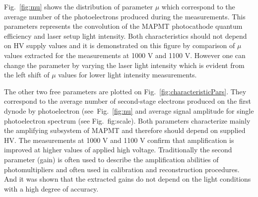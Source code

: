 Fig.~\ref{fig:mu} shows the distribution of parameter $\mu$ which correspond to the average number of the photoelectrons produced during the measurements.
This parameters represents the convolution of the MAPMT photocathode quantum efficiency and laser setup light intensity.
Both characteristics should not depend on HV supply values and it is demonstrated on this figure by comparison of $\mu$ values extracted for the measurements at 1000 V and 1100 V.
However one can change the parameter by varying the laser light intensity which is evident from the left shift of $\mu$ values for lower light intensity measurements.

The other two free parameters are plotted on Fig.~\ref{fig:characteristicPars}.
They correspond to the average number of second-stage electrons produced on the first dynode by photoelectron (see~Fig.~\ref{fig:nu} and average signal amplitude for single photoelectron spectrum (see Fig.~{fig:scale}).
Both parameters characterize mainly the amplifying subsystem of MAPMT and therefore should depend on supplied HV.
The measurements at 1000 V and 1100 V confirm that amplification is improved at higher values of applied high voltage.
Traditionally the second parameter (gain) is often used to describe the amplification abilities of photomultipliers and often used in calibration and reconstruction procedures.
And it was shown that the extracted gains do not depend on the light conditions with a high degree of accuracy.
\fi